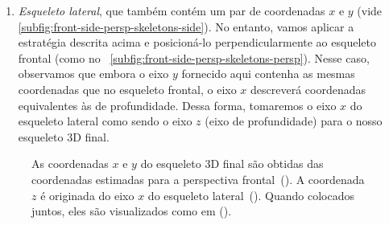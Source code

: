 \begin{enumerate}
\begin{enumerate}
              \item \textit{Esqueleto lateral}, que também contém um par de coordenadas \(x\) e \(y\) (vide \autoref{subfig:front-side-persp-skeletons-side}).
                    No entanto, vamos aplicar a estratégia descrita acima e posicioná-lo perpendicularmente ao esqueleto frontal (como no ~\autoref{subfig:front-side-persp-skeletons-persp}). Nesse caso, observamos que embora o eixo \(y\) fornecido aqui contenha as mesmas coordenadas que no esqueleto frontal, o eixo \(x\) descreverá coordenadas equivalentes às de profundidade. Dessa forma, tomaremos o eixo \(x\) do esqueleto lateral como sendo o eixo \(z\) (eixo de profundidade) para o nosso esqueleto 3D final.
          \end{enumerate}

          \begin{figure}[ht!]
              \centering
              \caption{\textmd{As coordenadas \(x\) e \(y\) do esqueleto 3D final são obtidas das coordenadas estimadas para a perspectiva frontal~(). A coordenada \(z\) é originada do eixo \(x\) do esqueleto lateral~(). Quando colocados juntos, eles são visualizados como em ().}}
              \hfill
              \hfill
              \nomefonte{}
              \label{fig:front-side-persp-skeletons}
          \end{figure}


\end{enumerate}
